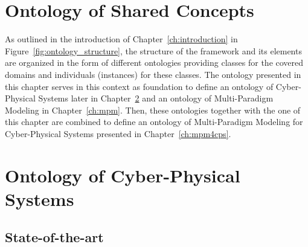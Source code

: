 \documentclass[final]{include/MPM4CPS/MPM4CPS-Report} %
\newcommand{\LEAD}[1]{{\marginpar{\textcolor{blue}{LEAD: #1}}}}
\newcommand{\ALSO}[1]{{\marginpar{\textcolor{lightgray}{ALSO: #1}}}}
\newcommand{\STATUS}[1]{{\marginpar{\textcolor{red}{STATUS: #1}}}}
\newcommand{\TODONOTE}[2][N.N.]{\todo{\tiny TODO[#1]: #2}}
\newcommand{\DONE}[2][N.N.]{{\todo[color=lightgray]{\tiny DONE[#1]: #2}}}
\newcommand{\LATERNOTE}[1]{{\todo[color=yellow]{\tiny LATER: #1}}}
\begin{document}
\chapter{Ontology of Shared Concepts}\LEAD{Holger}\ALSO{Dominique}\STATUS{started; initial comments by Holger}
\label{ch:core}
%
As outlined in the introduction of Chapter~\ref{ch:introduction} in Figure~\ref{fig:ontology_structure}, the structure of the framework and its elements are organized in the form of different ontologies providing classes for the covered domains and individuals (instances) for these classes. The ontology presented in this chapter serves in this context as foundation to define an ontology of Cyber-Physical Systems later in Chapter~\ref{ch:cps} and an ontology of Multi-Paradigm Modeling in Chapter~\ref{ch:mpm}. Then, these ontologies together with the one of this chapter are combined to define an ontology of Multi-Paradigm Modeling for Cyber-Physical Systems presented in Chapter~\ref{ch:mpm4cps}. 
%






\chapter{Ontology of Cyber-Physical Systems}
\label{ch:cps}

\section{State-of-the-art}
\end{document}
